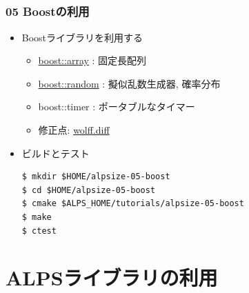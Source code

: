 \subsection*{\redm\whitem\greenb}
\begin{frame}[fragile]
  \frametitle{05 Boostの利用}
  \begin{itemize}
    \item Boostライブラリを利用する
      \begin{itemize}
        \item \href{http://boost.org/doc/html/array.html}{boost::array} : 固定長配列
        \item \href{http://boost.org/doc/html/boost_random.html}{boost::random} : 擬似乱数生成器, 確率分布
        \item boost::timer : ポータブルなタイマー
        \item 修正点: \href{https://github.com/cmsi/alps-tutorial/blob/develop/alpsize/05-wolff.diff}{wolff.diff}
      \end{itemize}
    \item ビルドとテスト
\begin{lstlisting}
$ mkdir $HOME/alpsize-05-boost
$ cd $HOME/alpsize-05-boost
$ cmake $ALPS_HOME/tutorials/alpsize-05-boost
$ make
$ ctest
\end{lstlisting}
  \end{itemize}
\end{frame}


\section{ALPSライブラリの利用}

